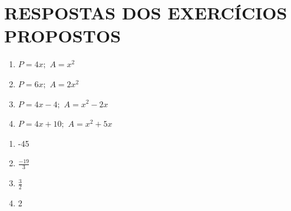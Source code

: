 \section{RESPOSTAS DOS EXERCÍCIOS PROPOSTOS}

\begin{respostas}{1}
    \ansitem{} \begin{multicols}{2}
        \begin{enumerate}[label=\alph*)]
            \item $P = 4x;$ $A = x^2$
        
            \item $P = 6x;$ $A = 2x^2$
        
            \item $P = 4x-4;$ $A = x^2-2x$
            
            \item $P = 4x+10;$ $A = x^2+5x$
        \end{enumerate}
    \end{multicols}
    
    
    
    
    
    \ansitem{} \begin{multicols}{4}
        \begin{enumerate}[label=\alph*)]
            \item -45
        
            \item $\frac{-19}{3}$
        
            \item $\frac{3}{2}$
            
            \item 2
        \end{enumerate}
    \end{multicols}
    
\end{respostas}
